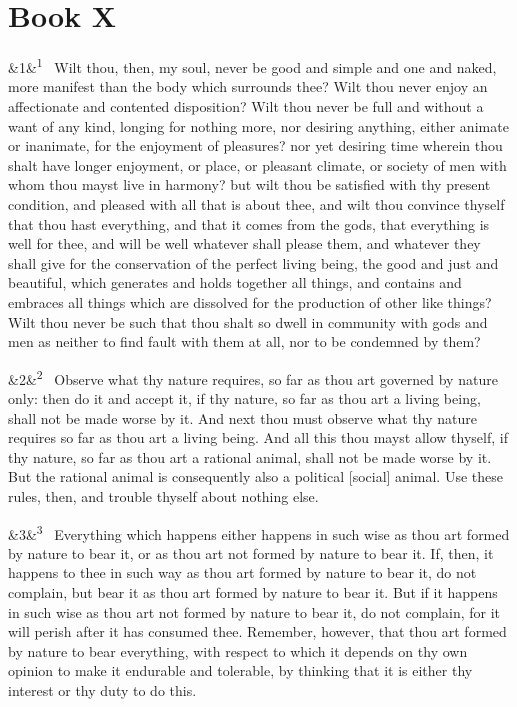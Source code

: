 \documentclass[12pt]{article}
\newcommand{\para}[1][]{\par\noindent\ifx&#1&\else\textsuperscript{\footnotesize #1}~\fi}
\begin{document}
\section*{Book X}

\para[1] Wilt thou, then, my soul, never be good and simple and one and naked,
more manifest than the body which surrounds thee? Wilt thou never enjoy
an affectionate and contented disposition? Wilt thou never be full and
without a want of any kind, longing for nothing more, nor desiring
anything, either animate or inanimate, for the enjoyment of pleasures?
nor yet desiring time wherein thou shalt have longer enjoyment, or
place, or pleasant climate, or society of men with whom thou mayst live
in harmony? but wilt thou be satisfied with thy present condition, and
pleased with all that is about thee, and wilt thou convince thyself that
thou hast everything, and that it comes from the gods, that everything
is well for thee, and will be well whatever shall please them, and
whatever they shall give for the conservation of the perfect living
being, the good and just and beautiful, which generates and holds
together all things, and contains and embraces all things which are
dissolved for the production of other like things? Wilt thou never be
such that thou shalt so dwell in community with gods and men as neither
to find fault with them at all, nor to be condemned by them?

\para[2] Observe what thy nature requires, so far as thou art governed by
nature only: then do it and accept it, if thy nature, so far as thou art
a living being, shall not be made worse by it. And next thou must
observe what thy nature requires so far as thou art a living being. And
all this thou mayst allow thyself, if thy nature, so far as thou art a
rational animal, shall not be made worse by it. But the rational animal
is consequently also a political [social] animal. Use these rules, then,
and trouble thyself about nothing else.

\para[3] Everything which happens either happens in such wise as thou art
formed by nature to bear it, or as thou art not formed by nature to bear
it. If, then, it happens to thee in such way as thou art formed by
nature to bear it, do not complain, but bear it as thou art formed by
nature to bear it. But if it happens in such wise as thou art not formed
by nature to bear it, do not complain, for it will perish after it has
consumed thee. Remember, however, that thou art formed by nature to bear
everything, with respect to which it depends on thy own opinion to make
it endurable and tolerable, by thinking that it is either thy interest
or thy duty to do this.
\end{document}
